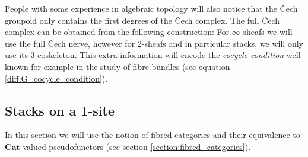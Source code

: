     People with some experience in algebraic topology will also notice that the \v{C}ech groupoid only contains the first degrees of the \v{C}ech complex. The full \v{C}ech complex can be obtained from the following construction:
    For $\infty$-sheafs we will use the full \v{C}ech nerve, however for 2-sheafs and in particular stacks, we will only use its 3-coskeleton. This extra information will encode the \textit{cocycle condition} well-known for example in the study of fibre bundles (see equation \ref{diff:G_cocycle_condition}).

\subsection{Stacks on a 1-site}

    In this section we will use the notion of fibred categories and their equivalence to $\mathbf{Cat}$-valued pseudofunctors (see section \ref{section:fibred_categories}).

